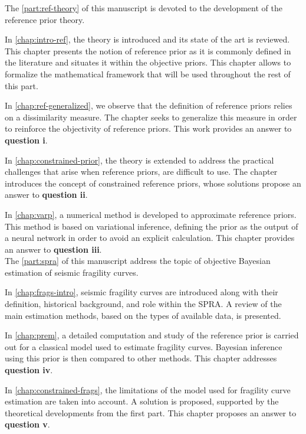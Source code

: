 The \cref{part:ref-theory} of this manuscript is devoted to the development of the reference prior theory.

\noindent
In \cref{chap:intro-ref}, the theory is introduced and its state of the art is reviewed. This chapter presents the notion of reference prior as it is commonly defined in the literature and situates it within the objective priors. This chapter allows to formalize the mathematical framework that will be used throughout the rest of this part.

\noindent
In \cref{chap:ref-generalized}, we observe that the definition of reference priors relies on a dissimilarity measure. The chapter seeks to generalize this measure in order to reinforce the objectivity of reference priors. This work provides an answer to \textbf{question i}.

\noindent
In \cref{chap:constrained-prior}, the theory is extended to address the practical challenges that arise when reference priors, are difficult to use. The chapter introduces the concept of constrained reference priors, whose solutions propose an answer to \textbf{question ii}.

\noindent
In \cref{chap:varp}, a numerical method is developed to approximate reference priors. This method is based on variational inference, defining the prior as the output of a neural network in order to avoid an explicit calculation. This chapter provides an answer to \textbf{question iii}.\\


The \cref{part:spra}
of this manuscript address the topic of objective Bayesian estimation of seismic fragility curves.

\noindent
In \cref{chap:frags-intro}, seismic fragility curves are introduced along with their definition, historical background, and role within the SPRA. A review of the main estimation methods, based on the types of available data, is presented.

\noindent
In \cref{chap:prem}, a detailed computation and study of the reference prior is carried out for a classical model used to estimate fragility curves. Bayesian inference using this prior is then compared to other methods. This chapter addresses \textbf{question iv}.

\noindent
In \cref{chap:constrained-frags}, the limitations of the model used for fragility curve estimation are taken into account. A solution is proposed, supported by the theoretical developments from the first part. This chapter proposes an answer to \textbf{question v}.

